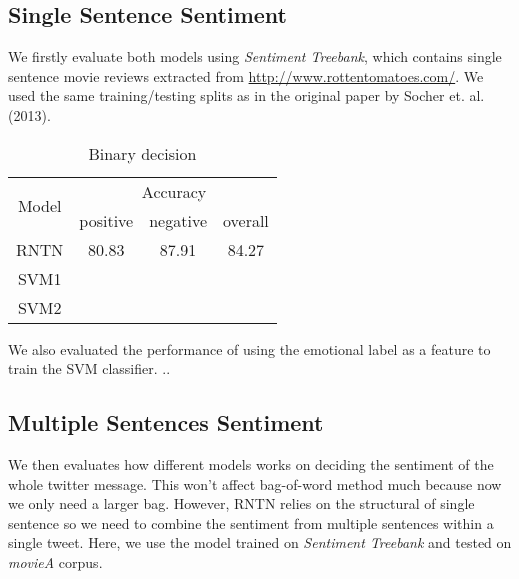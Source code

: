 \subsection{Single Sentence Sentiment}
We firstly evaluate both models using \textit{Sentiment Treebank}, which contains single sentence movie reviews extracted from \url{http://www.rottentomatoes.com/}. We used the same training/testing splits as in the original paper by Socher et. al. (2013). 

\begin{table}[H]
  \begin{center}
    \begin{tabular}{cccc}\hline
      \multirow{2}{*}{Model} 
      & \multicolumn{3}{c}{Accuracy} \\\cline{2-4}
    & positive & negative & overall \\ \hline
    RNTN  & 80.83      &   87.91   &  84.27      \\ 
    SVM1  & ~        &          &         \\ 
    SVM2  & ~        &          &         \\ \hline
    \end{tabular}
    \end{center}
    \caption{\label{exp1_1} Binary decision}
\end{table}

We also evaluated the performance of using the emotional label as a feature to train the SVM classifier. ..


\subsection{Multiple Sentences Sentiment}
We then evaluates how different models works on deciding the sentiment of the whole twitter message. This won't affect bag-of-word method much because now we only need a larger bag. However, RNTN relies on the structural of single sentence so we need to combine the sentiment from multiple sentences within a single tweet. Here, we use the model trained on \textit{Sentiment Treebank} and tested on \textit{movieA} corpus. 

